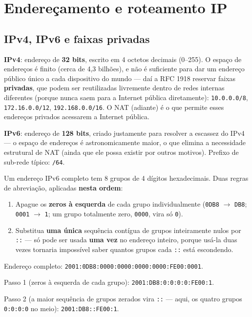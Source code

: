 \section{Endereçamento e roteamento IP}

\subsection{IPv4, IPv6 e faixas privadas}

\begin{conceito}
\textbf{IPv4}: endereço de \textbf{32 bits}, escrito em 4 octetos decimais
(0--255). O espaço de endereços é finito (cerca de 4,3 bilhões), e não é
suficiente para dar um endereço público único a cada dispositivo do mundo
--- daí a RFC 1918 reservar faixas \textbf{privadas}, que podem ser
reutilizadas livremente dentro de redes internas diferentes (porque nunca
saem para a Internet pública diretamente): \texttt{10.0.0.0/8},
\texttt{172.16.0.0/12}, \texttt{192.168.0.0/16}. O NAT (adiante) é o que
permite esses endereços privados acessarem a Internet pública.

\textbf{IPv6}: endereço de \textbf{128 bits}, criado justamente para
resolver a escassez do IPv4 --- o espaço de endereços é astronomicamente
maior, o que elimina a necessidade estrutural de NAT (ainda que ele possa
existir por outros motivos). Prefixo de sub-rede típico: \texttt{/64}.
\end{conceito}

\begin{conceito}
Um endereço IPv6 completo tem 8 grupos de 4 dígitos hexadecimais. Duas
regras de abreviação, aplicadas \textbf{nesta ordem}:
\begin{enumerate}
\item Apague os \textbf{zeros à esquerda} de cada grupo individualmente
(\texttt{0DB8} $\to$ \texttt{DB8}; \texttt{0001} $\to$ \texttt{1}; um grupo
totalmente zero, \texttt{0000}, vira só \texttt{0}).
\item Substitua \textbf{uma única} sequência contígua de grupos
inteiramente nulos por \texttt{::} --- só pode ser usada \textbf{uma vez}
no endereço inteiro, porque usá-la duas vezes tornaria impossível saber
quantos grupos cada \texttt{::} está escondendo.
\end{enumerate}
\end{conceito}

\begin{exemplo}
Endereço completo: \texttt{2001:0DB8:0000:0000:0000:0000:FE00:0001}.

Passo 1 (zeros à esquerda de cada grupo): \texttt{2001:DB8:0:0:0:0:FE00:1}.

Passo 2 (a maior sequência de grupos zerados vira \texttt{::} --- aqui, os
quatro grupos \texttt{0:0:0:0} no meio): \texttt{2001:DB8::FE00:1}.
\end{exemplo}

